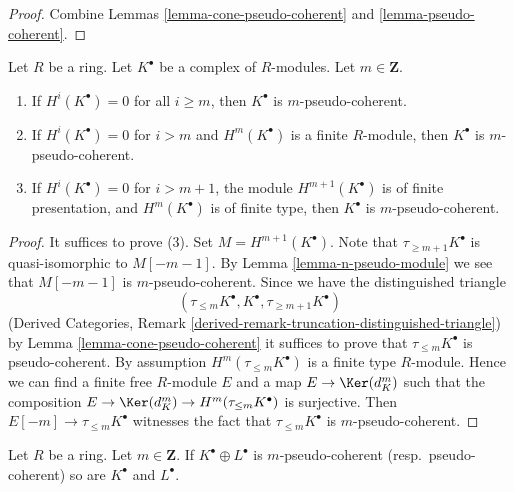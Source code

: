 \begin{proof}
Combine
Lemmas \ref{lemma-cone-pseudo-coherent} and \ref{lemma-pseudo-coherent}.
\end{proof}

\begin{lemma}
\label{lemma-recognize-pseudo-coherent}
Let $R$ be a ring. Let $K^\bullet$ be a complex of $R$-modules.
Let $m \in \mathbf{Z}$.
\begin{enumerate}
\item If $H^i(K^\bullet) = 0$ for all $i \geq m$, then
$K^\bullet$ is $m$-pseudo-coherent.
\item If $H^i(K^\bullet) = 0$ for $i > m$ and $H^m(K^\bullet)$ is
a finite $R$-module, then $K^\bullet$ is $m$-pseudo-coherent.
\item If $H^i(K^\bullet) = 0$ for $i > m + 1$, the module
$H^{m + 1}(K^\bullet)$ is of finite presentation, and
$H^m(K^\bullet)$ is of finite type, then $K^\bullet$ is
$m$-pseudo-coherent.
\end{enumerate}
\end{lemma}

\begin{proof}
It suffices to prove (3). Set $M = H^{m + 1}(K^\bullet)$.
Note that $\tau_{\geq m + 1}K^\bullet$ is quasi-isomorphic to
$M[- m - 1]$. By
Lemma \ref{lemma-n-pseudo-module}
we see that $M[- m - 1]$ is $m$-pseudo-coherent. Since we have
the distinguished triangle
$$
(\tau_{\leq m}K^\bullet, K^\bullet, \tau_{\geq m + 1}K^\bullet)
$$
(Derived Categories, Remark
\ref{derived-remark-truncation-distinguished-triangle}) by
Lemma \ref{lemma-cone-pseudo-coherent}
it suffices to prove that $\tau_{\leq m}K^\bullet$ is pseudo-coherent.
By assumption $H^m(\tau_{\leq m}K^\bullet)$ is a finite type $R$-module.
Hence we can find a finite free $R$-module $E$ and a map
$E \to \Ker(d_K^m)$ such that the composition
$E \to \Ker(d_K^m) \to H^m(\tau_{\leq m}K^\bullet)$ is surjective.
Then $E[-m] \to \tau_{\leq m}K^\bullet$ witnesses the fact
that $\tau_{\leq m}K^\bullet$ is $m$-pseudo-coherent.
\end{proof}

\begin{lemma}
\label{lemma-summands-pseudo-coherent}
Let $R$ be a ring. Let $m \in \mathbf{Z}$. If $K^\bullet \oplus L^\bullet$
is $m$-pseudo-coherent (resp.\ pseudo-coherent)
so are $K^\bullet$ and $L^\bullet$.
\end{lemma}


